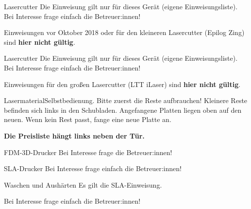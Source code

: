 \begin{schild}[farbe=gelb, modell=LTT iLaser, einweisung=lasercutter-einweisung,
	kontakt={AG Technik, \mail{kontakt@fablab.fau.de}}]
	{Lasercutter}{}
Die Einweisung gilt nur für dieses Gerät (eigene Einweisungsliste).
Bei Interesse frage einfach die Betreuer:innen!

Einweisungen vor Oktober 2018 oder für den kleineren Lasercutter (Epilog Zing)
sind \textbf{hier nicht gültig}.
\end{schild}

\begin{schild}[farbe=gelb, modell=Epilog Zing, einweisung=lasercutter-einweisung,
	kontakt={AG Technik, \mail{kontakt@fablab.fau.de}}]
	{Lasercutter}{}
Die Einweisung gilt nur für dieses Gerät (eigene Einweisungsliste).
Bei Interesse frage einfach die Betreuer:innen!

Einweisungen für den großen Lasercutter (LTT iLaser) sind \textbf{hier nicht gültig}.
\end{schild}

\begin{schild}[farbe=gruen, seite=lasercutter]
	{Lasermaterial}{Selbstbedienung. Bitte zuerst die Reste aufbrauchen!}
Kleinere Reste befinden sich links in den Schubladen.
Angefangene Platten liegen oben auf den neuen.
Wenn kein Rest passt, fange eine neue Platte an.

\textbf{Die Preisliste hängt links neben der Tür.}
\end{schild}

\begin{schild}[farbe=gelb, modell=Bambu Lab, einweisung=3d-drucker-einweisung]
	{FDM-3D-Drucker}{}
Bei Interesse frage die Betreuer:innen!
\end{schild}

\begin{schild}[farbe=gelb, einweisung=sla-drucker-einweisung, symbole={M004, M009}]
	{SLA-Drucker}{}
Bei Interesse frage einfach die Betreuer:innen!
\end{schild}

\begin{schild}[farbe=gelb, modell=Formlabs Form Wash und Form Cure, einweisung=sla-drucker-einweisung,
	symbole={GHS05, GHS07, GHS08, GHS09, M004, M009}]
	{Waschen und Aushärten}{}
Es gilt die SLA-Einweisung.

Bei Interesse frage einfach die Betreuer:innen!
\end{schild}


